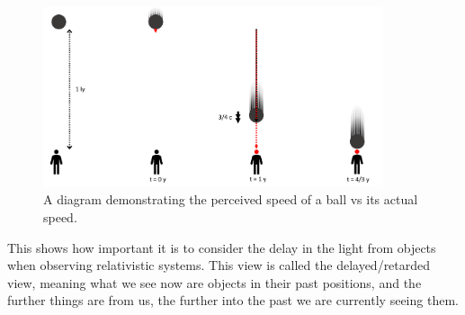 \begin{figure}[H]
	\centering
	\includegraphics[width=10cm]{images/pdf/Perceived_speed.pdf}
	\caption{A diagram demonstrating the perceived speed of a ball vs its actual speed.}
	\label{fig: perceived vs actual speed}
\end{figure}

This shows how important it is to consider the delay in the light from objects when observing relativistic systems.
This view is called the delayed/retarded view, meaning what we see now are objects in their past positions, and the further things are from us, the further into the past we are currently seeing them.







